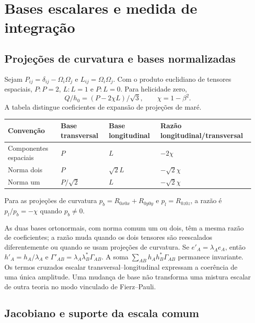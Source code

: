 \chapter{Bases escalares e medida de integração}
\label{ap:convencoes-medidas}

\section{Projeções de curvatura e bases normalizadas}

Sejam $P_{ij}=\delta_{ij}-\Omega_i\Omega_j$ e $L_{ij}=\Omega_i\Omega_j$. Com o produto euclidiano de tensores espaciais, $P:P=2$, $L:L=1$ e $P:L=0$. Para helicidade zero,
\begin{equation}
 Q/h_0=(P-2\chi L)/\sqrt3,\qquad \chi=1-\beta^2.
\end{equation}
A tabela distingue coeficientes de expansão de projeções de maré.
\begin{center}
\begin{tabular}{p{}p{}p{}p{}}
\toprule
Convenção & Base transversal & Base longitudinal & Razão longitudinal/transversal\\
\midrule
Componentes espaciais & $P$ & $L$ & $-2\chi$\\
Norma dois & $P$ & $\sqrt2L$ & $-\sqrt2\chi$\\
Norma um & $P/\sqrt2$ & $L$ & $-\sqrt2\chi$\\
\bottomrule
\end{tabular}
\end{center}
Para as projeções de curvatura $p_b=R_{0x0x}+R_{0y0y}$ e $p_l=R_{0z0z}$, a razão é $p_l/p_b=-\chi$ quando $p_b\ne0$.

As duas bases ortonormais, com norma comum um ou dois, têm a mesma razão de coeficientes; a razão muda quando os dois tensores são reescalados diferentemente ou quando se usam projeções de curvatura. Se $e'_A=\lambda_Ae_A$, então $h'_A=h_A/\lambda_A$ e $\Gamma'_{AB}=\lambda_A\lambda_B^*\Gamma_{AB}$. A soma $\sum_{AB}h_Ah_B^*\Gamma_{AB}$ permanece invariante. Os termos cruzados escalar transversal--longitudinal expressam a coerência de uma única amplitude. Uma mudança de base não transforma uma mistura escalar de outra teoria no modo vinculado de Fierz--Pauli.

\section{Jacobiano e suporte da escala comum}

